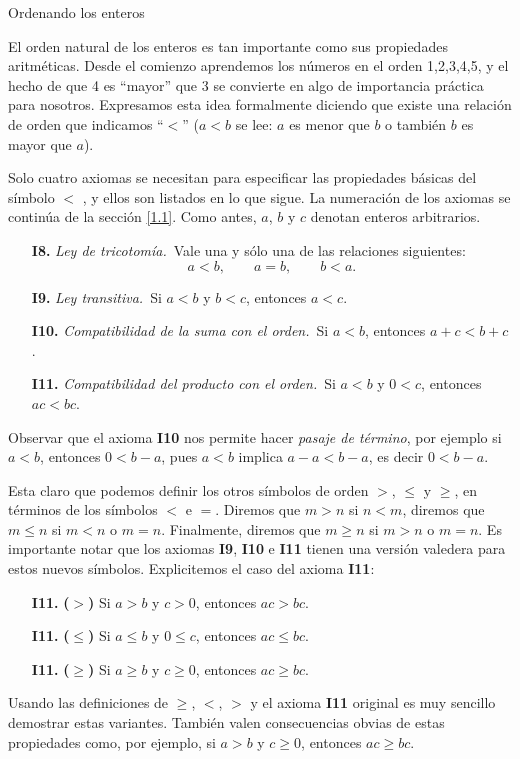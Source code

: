 \documentclass[11pt,spanish,makeidx]{amsbook}
\theoremstyle{definition}
\theoremstyle{remark}
\begin{document}
\begin{section}{Ordenando los enteros}\label{1.2}

El orden natural de los enteros es tan importante como sus propiedades aritméticas. Desde el comienzo aprendemos los números en el orden 1,2,3,4,5, y el hecho de que 4 es ``mayor'' que 3 se convierte en algo de importancia práctica para nosotros. Expresamos esta idea formalmente diciendo que existe una relación de orden que indicamos ``$<$'' ($a < b$ se lee: $a$ es menor que $b$ o también $b$ es mayor que $a$). 

Solo cuatro axiomas se necesitan para especificar las propiedades básicas del símbolo $<$ , y ellos son listados en lo que sigue. La numeración de los axiomas se continúa de la sección \ref{1.1}. Como antes, $a$, $b$ y $c$ denotan enteros arbitrarios. 
\begin{enumerate}
\item[{\bf I8.}] {\em Ley de tricotomía.}\, Vale una y sólo una de las relaciones
siguientes:
$$
a<b, \qquad a = b, \qquad b < a.
$$
\item[{\bf I9.}] {\em Ley transitiva.}\, Si $a< b$ y $b < c$, entonces $a<c$.
\item[{\bf I10.}] {\em Compatibilidad de la suma con el orden.}\, Si $a < b$, entonces $a+c < b+c$. 
\item[{\bf I11.}] {\em Compatibilidad del producto con el orden.}\, Si $a< b$ y $0< c$, entonces $ac < bc$. 
\end{enumerate}


Observar que el axioma {\bf I10} nos permite hacer \textit{pasaje de término}, por ejemplo si $a < b$, entonces $0 < b -a$, pues $a < b$ implica $a - a < b - a$, es decir $0 < b -a$. 


Esta claro que podemos definir los otros símbolos de orden $>$, $\le$ y $\ge$, en términos de los símbolos $<$ e $=$. Diremos que $m>n$ si  $n<m$, diremos que $m \le n$ si $m<n$ o $m=n$. Finalmente, diremos que $m \ge n$ si $m > n$ o $m=n$.  Es importante notar que los  axiomas {\bf I9}, {\bf I10} e {\bf I11} tienen una versión valedera para estos nuevos símbolos. Explicitemos el caso  del axioma {\bf I11}:
\begin{enumerate}
\item[{\bf I11.}] {\bf ($>$)} Si $a > b$ y $c>0$, entonces $ac > bc$.
\item[{\bf I11.}] {\bf ($\le$)} Si $a \le b$ y $0 \le c$, entonces $ac \le bc$.
\item[{\bf I11.}] {\bf ($\ge$)} Si $a\ge b$ y $c\ge 0$, entonces $ac \ge bc$.
\end{enumerate}
Usando las definiciones de $\ge$, $<$, $>$ y el axioma {\bf I11} original es muy sencillo demostrar estas variantes. También valen consecuencias obvias de estas propiedades como, por ejemplo, si $a > b$ y $c \ge 0$, entonces $ac \ge bc$. 



\end{section}
\end{document}
